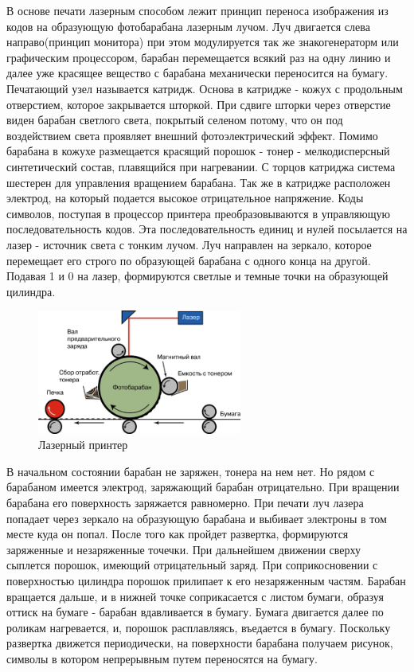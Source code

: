 \documentclass[unicode, 12pt, a4paper, oneside]{article}
\begin{document}
В основе печати лазерным способом лежит принцип переноса изображения из кодов на образующую фотобарабана лазерным лучом. Луч двигается слева направо(принцип монитора) при этом модулируется так же знакогенераторм или графическим процессором, барабан перемещается всякий раз на одну линию и далее уже красящее вещество с барабана механически переносится на бумагу. Печатающий узел называется катридж. Основа в катридже - кожух с продольным отверстием, которое закрывается шторкой. При сдвиге шторки через отверстие виден барабан светлого света, покрытый селеном потому, что он под воздействием света проявляет внешний фотоэлектрический эффект. Помимо барабана в кожухе размещается красящий порошок - тонер - мелкодисперсный синтетический состав, плавящийся при нагревании. С торцов катриджа система шестерен для управления вращением барабана. Так же в катридже расположен электрод, на который подается высокое отрицательное напряжение. Коды символов, поступая в процессор принтера преобразовываются в управляющую последовательность кодов. Эта последовательность единиц и нулей посылается на лазер - источник света с тонким лучом. Луч направлен на зеркало, которое перемещает его строго по образующей барабана с одного конца на другой. Подавая 1 и 0 на лазер, формируются светлые и темные точки на образующей цилиндра.
\begin{figure}[H]
\centering
\includegraphics[width=0.6\textwidth]{105_Laser.png}
\caption{Лазерный принтер}
\end{figure}
В начальном состоянии барабан не заряжен, тонера на нем нет. Но рядом с барабаном имеется электрод, заряжающий барабан отрицательно. При вращении барабана его поверхность заряжается равномерно. При печати луч лазера попадает через зеркало на образующую барабана и выбивает электроны в том месте куда он попал. После того как пройдет развертка, формируются заряженные и незаряженные точечки. При дальнейшем движении сверху сыплется порошок, имеющий отрицательный заряд. При соприкосновении с поверхностью цилиндра порошок прилипает к его незаряженным частям. Барабан вращается дальше, и в нижней точке соприкасается с листом бумаги, образуя оттиск на бумаге - барабан вдавливается в бумагу. Бумага двигается далее по роликам нагревается, и, порошок расплавляясь, въедается в бумагу. Поскольку развертка движется периодически, на поверхности барабана получаем рисунок, символы в котором непрерывным путем переносятся на бумагу.
\end{document}
